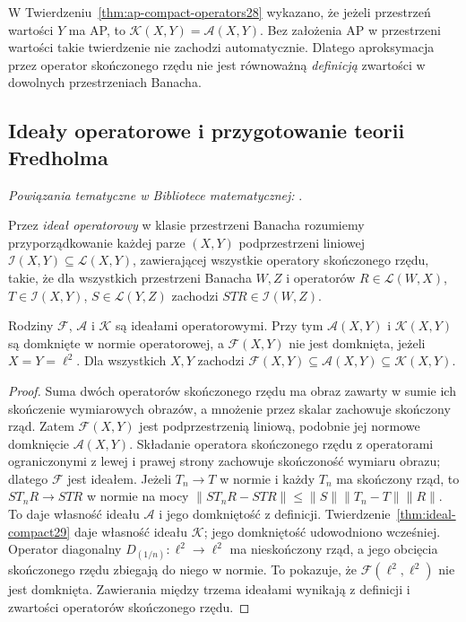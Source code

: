 \begin{uwaga}
\label{rem:nonapproximable29}
W Twierdzeniu~\ref{thm:ap-compact-operators28} wykazano,
że jeżeli przestrzeń wartości $Y$ ma AP, to $\mathcal K(X,Y)=\mathcal A(X,Y)$.
Bez założenia AP w przestrzeni wartości takie twierdzenie
nie zachodzi automatycznie. Dlatego aproksymacja przez
operator skończonego rzędu nie jest równoważną
\emph{definicją} zwartości w dowolnych przestrzeniach Banacha.
\end{uwaga}

\subsection{Ideały operatorowe i przygotowanie teorii Fredholma}

\noindent\emph{Powiązania tematyczne w Bibliotece matematycznej:} .


\begin{definicja}
\label{def:operator-ideal29}
Przez \emph{ideał operatorowy} w klasie przestrzeni Banacha
rozumiemy przyporządkowanie każdej parze $(X,Y)$
podprzestrzeni liniowej $\mathcal I(X,Y)\subseteq\mathcal L(X,Y)$,
zawierającej wszystkie operatory skończonego rzędu,
takie, że dla wszystkich przestrzeni Banacha $W,Z$
i operatorów $R\in\mathcal L(W,X)$, $T\in\mathcal I(X,Y)$,
$S\in\mathcal L(Y,Z)$ zachodzi
$STR\in\mathcal I(W,Z)$.
\end{definicja}

\begin{twierdzenie}
\label{thm:ideals29}
Rodziny $\mathcal F$, $\mathcal A$ i $\mathcal K$ są
ideałami operatorowymi. Przy tym $\mathcal A(X,Y)$
i $\mathcal K(X,Y)$ są domknięte w normie operatorowej,
a $\mathcal F(X,Y)$ nie jest domknięta, jeżeli
$X=Y=\ell^2$. Dla wszystkich $X,Y$ zachodzi
$\mathcal F(X,Y)\subseteq\mathcal A(X,Y)\subseteq
\mathcal K(X,Y)$.
\end{twierdzenie}
\begin{proof}
Suma dwóch operatorów skończonego rzędu ma obraz zawarty
w sumie ich skończenie wymiarowych obrazów, a mnożenie
przez skalar zachowuje skończony rząd. Zatem $\mathcal F(X,Y)$
jest podprzestrzenią liniową, podobnie jej normowe domknięcie
$\mathcal A(X,Y)$. Składanie operatora skończonego rzędu z operatorami
ograniczonymi z lewej i prawej strony zachowuje
skończoność wymiaru obrazu; dlatego $\mathcal F$ jest ideałem.
Jeżeli $T_n\to T$ w normie i każdy $T_n$ ma skończony
rząd, to $ST_nR\to STR$ w normie na mocy
$\|ST_nR-STR\|\le\|S\|\|T_n-T\|\|R\|$.
To daje własność ideału $\mathcal A$ i jego domkniętość
z definicji. Twierdzenie~\ref{thm:ideal-compact29}
daje własność ideału $\mathcal K$; jego domkniętość
udowodniono wcześniej. Operator diagonalny
$D_{(1/n)}:\ell^2\to\ell^2$ ma nieskończony rząd,
a jego obcięcia skończonego rzędu zbiegają do niego
w normie. To pokazuje, że $\mathcal F(\ell^2,\ell^2)$
nie jest domknięta. Zawierania między trzema ideałami
wynikają z definicji i zwartości operatorów
skończonego rzędu.
\end{proof}

